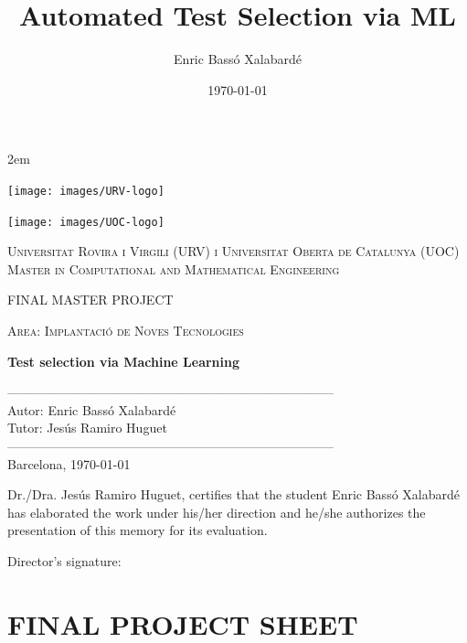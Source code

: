 \documentclass[a4paper, 11pt]{report}
\title{Automated Test Selection via ML}
\author{Enric Bassó Xalabardé}
\date{\today}
\begin{document}
\newpage
\thispagestyle{empty}

\baselineskip 2em


\centerline{\texttt{[image: images/URV-logo]} }
\centerline{ \texttt{[image: images/UOC-logo]}}

\begin{center}

\vspace*{1.5cm}

\textsc{Universitat Rovira i Virgili (URV) i Universitat Oberta de Catalunya (UOC) \\
 Master in Computational and Mathematical Engineering\\}


\vspace*{1cm}

\textsc{\Large FINAL MASTER PROJECT }

\vspace*{0.5cm}

\textsc{\large Area: Implantaci\'o de Noves Tecnologies}


\vspace*{1cm}

\textbf{\Large Test selection via Machine Learning }


\vspace{1.5cm}
-----------------------------------------------------------------------------\\
Autor:      Enric Bass\'o Xalabard\'e\\
Tutor:      Jes\'us Ramiro Huguet\\
-----------------------------------------------------------------------------\\
\vspace*{0.5cm}
Barcelona, \today
\end{center}

\newpage

\vspace{1.5cm}
Dr./Dra.  Jes\'us Ramiro Huguet, certifies that the student Enric Bass\'o Xalabard\'e  has elaborated the work under his/her direction and he/she authorizes the presentation of this memory for its evaluation.

\vspace{1cm}

Director's signature:

\pagestyle{empty}
\hfill

\chapter*{FINAL PROJECT SHEET}
\setcounter{page}{1}
\pagestyle{plain}
\end{document}
